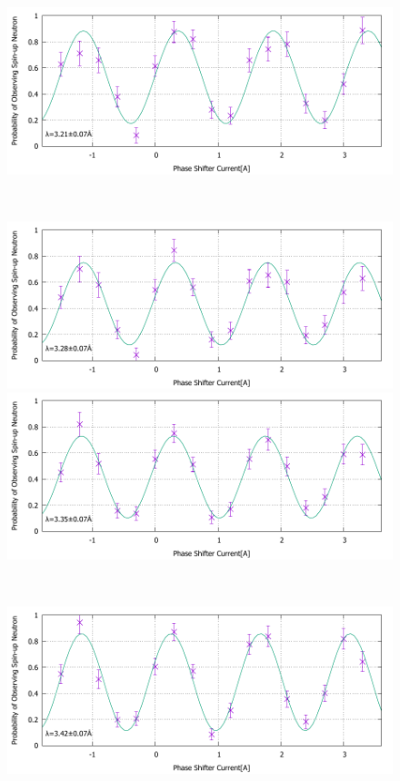 \begin{figure}[h]
\begin{minipage}{0.5\hsize}
\includegraphics[width=\hsize]{discussion/IF_rb/Interference_rb_fit450.pdf}
\end{minipage}\\
\begin{minipage}{0.5\hsize}
\includegraphics[width=\hsize]{discussion/IF_rb/Interference_rb_fit460.pdf}
\end{minipage}
\begin{minipage}{0.5\hsize}
\includegraphics[width=\hsize]{discussion/IF_rb/Interference_rb_fit470.pdf}
\end{minipage}\\
\begin{minipage}{0.5\hsize}
\includegraphics[width=\hsize]{discussion/IF_rb/Interference_rb_fit480.pdf}

\end{minipage}
\end{figure}
